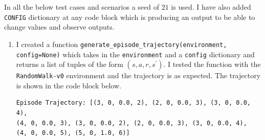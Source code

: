 In all the below test cases and scenarios a seed of $21$ is used. I have also added \texttt{CONFIG} dictionary at any code block which is producing an output to be able to change values and observe outputs.
\begin{enumerate}
    
    \item I created a function \texttt{generate\_episode\_trajectory(environment, config=None)} which takes in the \texttt{environment} and a \texttt{config} dictionary and returns a list of tuples of the form $(s, a, r, s^{\prime})$. I tested the function with the \texttt{RandomWalk-v0} environment and the trajectory is as expected. The trajectory is shown in the code block below.
    \begin{verbatim}
Episode Trajectory: [(3, 0, 0.0, 2), (2, 0, 0.0, 3), (3, 0, 0.0, 4), 
(4, 0, 0.0, 3), (3, 0, 0.0, 2), (2, 0, 0.0, 3), (3, 0, 0.0, 4), 
(4, 0, 0.0, 5), (5, 0, 1.0, 6)]
    \end{verbatim}
    

\end{enumerate}
